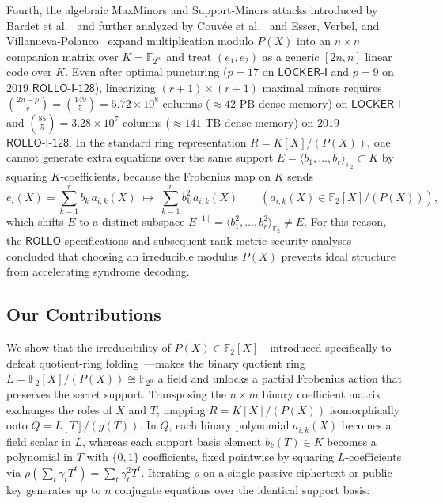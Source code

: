 \documentclass[11pt,a4paper]{article}
\theoremstyle{definition}
\theoremstyle{remark}
\newcommand{\F}{\mathbb{F}}
\newcommand{\Ftwo}{\mathbb{F}_2}
\begin{document}
Fourth, the algebraic MaxMinors and Support-Minors attacks introduced by Bardet et al.~\cite{BBB+20,BBC+20,BBGT23} and further analyzed by Couv\'{e}e et al.~\cite{CWZ26} and Esser, Verbel, and Villanueva-Polanco~\cite{EVV26} expand multiplication modulo $P(X)$ into an $n \times n$ companion matrix over $K = \F_{2^m}$ and treat $(e_1, e_2)$ as a generic $[2n, n]$ linear code over $K$. Even after optimal puncturing ($p = 17$ on $\mathsf{LOCKER\text{-}I}$ and $p = 9$ on $2019$ $\mathsf{ROLLO\text{-}I\text{-}128}$), linearizing $(r+1)\times(r+1)$ maximal minors requires $\binom{2n - p}{r} = \binom{149}{5} = 5.72 \times 10^8$ columns ($\approx 42\text{ PB}$ dense memory) on $\mathsf{LOCKER\text{-}I}$ and $\binom{85}{5} = 3.28 \times 10^7$ columns ($\approx 141\text{ TB}$ dense memory) on $2019$ $\mathsf{ROLLO\text{-}I\text{-}128}$. In the standard ring representation $R = K[X]/(P(X))$, one cannot generate extra equations over the same support $E = \langle b_1, \dots, b_r \rangle_{\Ftwo} \subset K$ by squaring $K$-coefficients, because the Frobenius map on $K$ sends
\[
    e_i(X) = \sum_{k=1}^{r} b_k\, a_{i,k}(X) \;\longmapsto\; \sum_{k=1}^{r} b_k^2\, a_{i,k}(X) \qquad (a_{i,k}(X) \in \Ftwo[X]/(P(X))),
\]
which shifts $E$ to a distinct subspace $E^{[1]} = \langle b_1^2, \dots, b_r^2 \rangle_{\Ftwo} \neq E$. For this reason, the $\mathsf{ROLLO}$ specifications and subsequent rank-metric security analyses~\cite{ROLLO20,AAD+22,ABD+24} concluded that choosing an irreducible modulus $P(X)$ prevents ideal structure from accelerating syndrome decoding.

\subsection{Our Contributions}
We show that the irreducibility of $P(X) \in \Ftwo[X]$---introduced specifically to defeat quotient-ring folding~\cite{HT15}---makes the binary quotient ring $L = \Ftwo[X]/(P(X)) \cong \F_{2^n}$ a field and unlocks a partial Frobenius action that preserves the secret support. Transposing the $n \times m$ binary coefficient matrix exchanges the roles of $X$ and $T$, mapping $R = K[X]/(P(X))$ isomorphically onto $Q = L[T]/(g(T))$. In $Q$, each binary polynomial $a_{i,k}(X)$ becomes a field scalar in $L$, whereas each support basis element $b_k(T) \in K$ becomes a polynomial in $T$ with $\{0, 1\}$ coefficients, fixed pointwise by squaring $L$-coefficients via $\rho(\sum_t \gamma_t T^t) = \sum_t \gamma_t^2 T^t$. Iterating $\rho$ on a single passive ciphertext or public key generates up to $n$ conjugate equations over the identical support basis:
\end{document}
